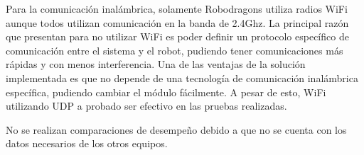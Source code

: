 Para la comunicación inalámbrica, solamente Robodragons utiliza radios WiFi aunque todos utilizan comunicación en la banda de 2.4Ghz. La principal razón que presentan para no utilizar WiFi es poder definir un protocolo específico de comunicación entre el sistema y el robot, pudiendo tener comunicaciones más rápidas y con menos interferencia. Una de las ventajas de la solución implementada es que no depende de una tecnología de comunicación inalámbrica específica, pudiendo cambiar el módulo fácilmente. A pesar de esto, WiFi utilizando UDP a probado ser efectivo en las pruebas realizadas.

No se realizan comparaciones de desempeño debido a que no se cuenta con los datos necesarios de los otros equipos. 





